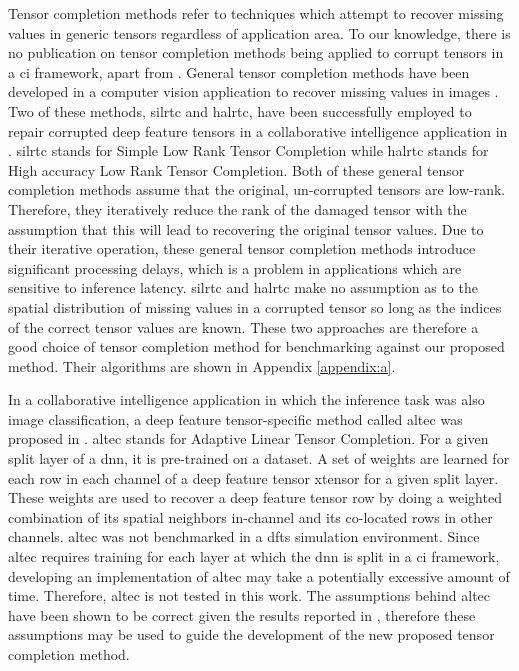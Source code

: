 Tensor completion methods refer to techniques which attempt to recover missing values in generic tensors regardless of application area. To our knowledge, there is no publication on tensor completion methods being applied to corrupt tensors in a \gls{ci} framework, apart from \cite{9017944}. General tensor completion methods have been developed in a computer vision application to recover missing values in images \cite{liu2012tensor}. Two of these methods, \gls{silrtc} and \gls{halrtc}, have been successfully employed to repair corrupted deep feature tensors in a collaborative intelligence application in \cite{9017944}. \gls{silrtc} stands for Simple Low Rank Tensor Completion while \gls{halrtc} stands for High accuracy Low Rank Tensor Completion. Both of these general tensor completion methods assume that the original, un-corrupted tensors are low-rank. Therefore, they iteratively reduce the rank of the damaged tensor with the assumption that this will lead to recovering the original tensor values. Due to their iterative operation, these general tensor completion methods introduce significant processing delays, which is a problem in applications which are sensitive to inference latency. \gls{silrtc} and \gls{halrtc} make no assumption as to the spatial distribution of missing values in a corrupted tensor so long as the indices of the correct tensor values are known. These two approaches are therefore a good choice of tensor completion method for benchmarking against our proposed method. Their algorithms are shown in Appendix \ref{appendix:a}.

In a collaborative intelligence application in which the inference task was also image classification, a deep feature tensor-specific method called \gls{altec} was proposed in \cite{9017944}. \gls{altec} stands for Adaptive Linear Tensor Completion. For a given split layer of a \gls{dnn}, it is pre-trained on a dataset. A set of weights are learned for each row in each channel of a deep feature tensor \gls{xtensor} for a given split layer. These weights are used to recover a deep feature tensor row by doing a weighted combination of its spatial neighbors in-channel and its co-located rows in other channels. \gls{altec} was not benchmarked in a \gls{dfts} simulation environment. Since \gls{altec} requires training for each layer at which the \gls{dnn} is split in a \gls{ci} framework, developing an implementation of \gls{altec} may take a potentially excessive amount of time. Therefore, \gls{altec} is not tested in this work. The assumptions behind \gls{altec} have been shown to be correct given the results reported in \cite{9017944}, therefore these assumptions may be used to guide the development of the new proposed tensor completion method.


